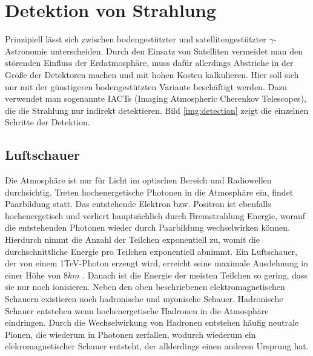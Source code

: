 \section{Detektion von Strahlung}
Prinzipiell lässt sich zwischen bodengestützter und satellitengestützter $\gamma$-Astronomie unterscheiden. Durch den Einsatz von Satelliten vermeidet man den störenden Einfluss der Erdatmosphäre, muss dafür allerdings Abstriche in der Größe der Detektoren machen und mit hohen Kosten kalkulieren. Hier soll sich nur mit der günstigeren bodengestützten Variante beschäftigt werden. Dazu verwendet man sogenannte IACTs (Imaging Atmospheric Cherenkov Telescopes), die die Strahlung nur indirekt detektieren. Bild \ref{img:detection} zeigt die einzelnen Schritte der Detektion.

\subsection{Luftschauer}
Die Atmosphäre ist nur für Licht im optischen Bereich und Radiowellen durchsichtig. Treten hochenergetische Photonen in die Atmosphäre ein, findet Paarbildung statt. Das entstehende Elektron bzw. Positron ist ebenfalls hochenergetisch und verliert hauptsächlich durch Bremstrahlung Energie, worauf die entstehenden Photonen wieder durch Paarbildung wechselwirken können. Hierdurch nimmt die Anzahl der Teilchen exponentiell zu, womit die durchschnittliche Energie pro Teilchen exponentiell abnimmt.
Ein Luftschauer, der von einem 1TeV-Photon erzeugt wird, erreicht seine maximale Ausdehnung in einer Höhe von $8\unit{km}$ \cite{GB-VHE}. Danach ist die Energie der meisten Teilchen so gering, dass sie nur noch ionisieren.
Neben den oben beschriebenen elektromagnetischen Schauern existieren noch hadronische und myonische Schauer. Hadronische Schauer entstehen wenn hochenergetische Hadronen in die Atmosphäre eindringen. Durch die Wechselwirkung von Hadronen entstehen häufig neutrale Pionen, die wiederum in Photonen zerfallen, wodurch wiederum ein elekromagnetischer Schauer entsteht, der allderdings einen anderen Ursprung hat. %

